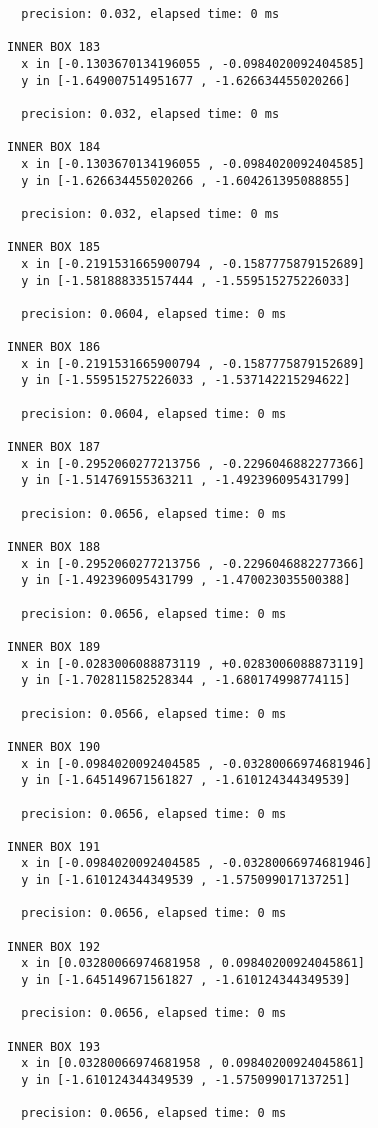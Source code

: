 \begin{verbatim}
  precision: 0.032, elapsed time: 0 ms

INNER BOX 183
  x in [-0.1303670134196055 , -0.0984020092404585]
  y in [-1.649007514951677 , -1.626634455020266]

  precision: 0.032, elapsed time: 0 ms

INNER BOX 184
  x in [-0.1303670134196055 , -0.0984020092404585]
  y in [-1.626634455020266 , -1.604261395088855]

  precision: 0.032, elapsed time: 0 ms

INNER BOX 185
  x in [-0.2191531665900794 , -0.1587775879152689]
  y in [-1.581888335157444 , -1.559515275226033]

  precision: 0.0604, elapsed time: 0 ms

INNER BOX 186
  x in [-0.2191531665900794 , -0.1587775879152689]
  y in [-1.559515275226033 , -1.537142215294622]

  precision: 0.0604, elapsed time: 0 ms

INNER BOX 187
  x in [-0.2952060277213756 , -0.2296046882277366]
  y in [-1.514769155363211 , -1.492396095431799]

  precision: 0.0656, elapsed time: 0 ms

INNER BOX 188
  x in [-0.2952060277213756 , -0.2296046882277366]
  y in [-1.492396095431799 , -1.470023035500388]

  precision: 0.0656, elapsed time: 0 ms

INNER BOX 189
  x in [-0.0283006088873119 , +0.0283006088873119]
  y in [-1.702811582528344 , -1.680174998774115]

  precision: 0.0566, elapsed time: 0 ms

INNER BOX 190
  x in [-0.0984020092404585 , -0.03280066974681946]
  y in [-1.645149671561827 , -1.610124344349539]

  precision: 0.0656, elapsed time: 0 ms

INNER BOX 191
  x in [-0.0984020092404585 , -0.03280066974681946]
  y in [-1.610124344349539 , -1.575099017137251]

  precision: 0.0656, elapsed time: 0 ms

INNER BOX 192
  x in [0.03280066974681958 , 0.09840200924045861]
  y in [-1.645149671561827 , -1.610124344349539]

  precision: 0.0656, elapsed time: 0 ms

INNER BOX 193
  x in [0.03280066974681958 , 0.09840200924045861]
  y in [-1.610124344349539 , -1.575099017137251]

  precision: 0.0656, elapsed time: 0 ms


\end{verbatim}
